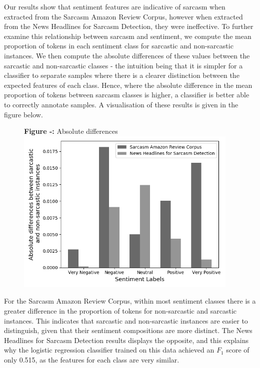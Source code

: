 \documentclass[12pt,a4paper]{article}
\begin{document}
\noindent Our results show that sentiment features are indicative of sarcasm when extracted from the Sarcasm Amazon Review Corpus, however when extracted from the News Headlines for Sarcasm Detection, they were ineffective. To further examine this relationship between sarcasm and sentiment, we compute the mean proportion of tokens in each sentiment class for sarcastic and non-sarcastic instances. We then compute the absolute differences of these values between the sarcastic and non-sarcastic classes - the intuition being that it is simpler for a classifier to separate samples where there is a clearer distinction between the expected features of each class. Hence, where the absolute difference in the mean proportion of tokens between sarcasm classes is higher, a classifier is better able to correctly annotate samples. A visualisation of these results is given in the figure below.

\begin{minipage}{0.4\textwidth}
	\begin{figure}[H]
		\begin{center}
			\textbf{Figure -:} Absolute differences\\
			\includegraphics[width=0.95\textwidth]{Images/absolute_differences.png}
			\label{Sarcasm Amazon Review Corpus}
		\end{center}
	\end{figure}
\end{minipage} \hfill
\begin{minipage}{0.6\textwidth}
	For the Sarcasm Amazon Review Corpus, within most sentiment classes there is a greater difference in the proportion of tokens for non-sarcastic and sarcastic instances. This indicates that sarcastic and non-sarcastic instances are easier to distinguish, given that their sentiment compositions are more distinct. The News Headlines for Sarcasm Detection results displays the opposite, and this explains why the logistic regression classifier trained on this data achieved an $F_1$  score of only 0.515, as the features for each class are very similar.
\end{minipage}
\end{document}
